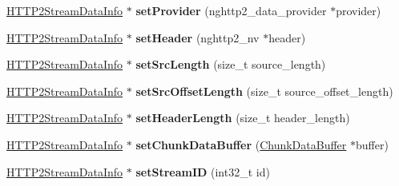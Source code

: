 \begin{DoxyCompactItemize}
\item 
\mbox{\label{classhttp2_1_1HTTP2StreamDataInfo_a78dcb5dc34d28ac01e382fb8a6e5e912}} 
\hyperlink{classhttp2_1_1HTTP2StreamDataInfo}{H\+T\+T\+P2\+Stream\+Data\+Info} $\ast$ {\bfseries set\+Provider} (nghttp2\+\_\+data\+\_\+provider $\ast$provider)
\item 
\mbox{\label{classhttp2_1_1HTTP2StreamDataInfo_ac935b87afd235a4fb638c4c22a89346d}} 
\hyperlink{classhttp2_1_1HTTP2StreamDataInfo}{H\+T\+T\+P2\+Stream\+Data\+Info} $\ast$ {\bfseries set\+Header} (nghttp2\+\_\+nv $\ast$header)
\item 
\mbox{\label{classhttp2_1_1HTTP2StreamDataInfo_a72d4b8754a10c25c50d595eec719f0c0}} 
\hyperlink{classhttp2_1_1HTTP2StreamDataInfo}{H\+T\+T\+P2\+Stream\+Data\+Info} $\ast$ {\bfseries set\+Src\+Length} (size\+\_\+t source\+\_\+length)
\item 
\mbox{\label{classhttp2_1_1HTTP2StreamDataInfo_af9d52bfe1c5f95e3d36611e37f99d0ba}} 
\hyperlink{classhttp2_1_1HTTP2StreamDataInfo}{H\+T\+T\+P2\+Stream\+Data\+Info} $\ast$ {\bfseries set\+Src\+Offset\+Length} (size\+\_\+t source\+\_\+offset\+\_\+length)
\item 
\mbox{\label{classhttp2_1_1HTTP2StreamDataInfo_a392e678864bbdced6ed0543f8470781d}} 
\hyperlink{classhttp2_1_1HTTP2StreamDataInfo}{H\+T\+T\+P2\+Stream\+Data\+Info} $\ast$ {\bfseries set\+Header\+Length} (size\+\_\+t header\+\_\+length)
\item 
\mbox{\label{classhttp2_1_1HTTP2StreamDataInfo_ac6e7022ddb2dbe8db45638bff30adbcb}} 
\hyperlink{classhttp2_1_1HTTP2StreamDataInfo}{H\+T\+T\+P2\+Stream\+Data\+Info} $\ast$ {\bfseries set\+Chunk\+Data\+Buffer} (\hyperlink{classhttp2_1_1ChunkDataBuffer}{Chunk\+Data\+Buffer} $\ast$buffer)
\item 
\mbox{\label{classhttp2_1_1HTTP2StreamDataInfo_a15d4a60ccdf6adfa7a7736c0b8fa0f66}} 
\hyperlink{classhttp2_1_1HTTP2StreamDataInfo}{H\+T\+T\+P2\+Stream\+Data\+Info} $\ast$ {\bfseries set\+Stream\+ID} (int32\+\_\+t id)
\end{DoxyCompactItemize}
